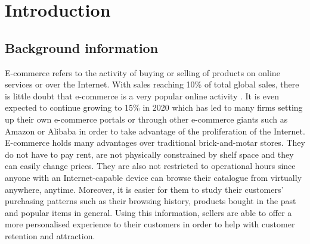 \documentclass[a4paper]{article}
\begin{document}
\pagebreak
\section{Introduction}
\subsection{Background information}
E-commerce refers to the activity of buying or selling of products on online services or over the Internet. With sales reaching 10\% of total global sales, there is little doubt that e-commerce is a very popular online activity \cite{nano3}. It is even expected to continue growing to 15\% in 2020 which has led to many firms setting up their own e-commerce portals or through other e-commerce giants such as Amazon or Alibaba in order to take advantage of the proliferation of the Internet. E-commerce holds many advantages over traditional brick-and-motar stores. They do not have to pay rent, are not physically constrained by shelf space and they can easily change prices. They are also not restricted to operational hours since anyone with an Internet-capable device can browse their catalogue from virtually anywhere, anytime. Moreover, it is easier for them to study their customers' purchasing patterns such as their browsing history, products bought in the past and popular items in general. Using this information, sellers are able to offer a more personalised experience to their customers in order to help with customer retention and attraction.
\newline
\newline
\end{document}
